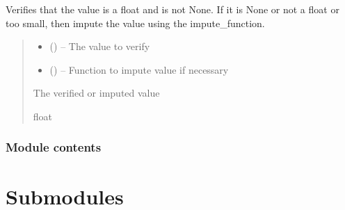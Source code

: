 \documentclass[letterpaper,10pt,english]{sphinxmanual}
\begin{document}
\begin{fulllineitems}
\label{\detokenize{fspsim.utils:fspsim.utils.SpaceObject.verify_value}}
\pysigstartsignatures
{}
\pysigstopsignatures
\sphinxAtStartPar
Verifies that the value is a float and is not None. If it is None or not a float or
too small, then impute the value using the impute\_function.
\begin{quote}\begin{description}
\begin{itemize}
\item {} 
\sphinxAtStartPar
{} () – The value to verify

\item {} 
\sphinxAtStartPar
{} () – Function to impute value if necessary

\end{itemize}

\sphinxAtStartPar
The verified or imputed value

\sphinxAtStartPar
float

\end{description}\end{quote}

\end{fulllineitems}



\subsubsection{Module contents}
\label{\detokenize{fspsim.utils:module-fspsim.utils}}\label{\detokenize{fspsim.utils:module-contents}}

\section{Submodules}
\label{\detokenize{fspsim:submodules}}
\end{document}
